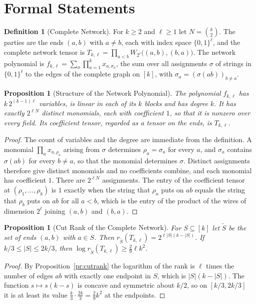 \documentclass[11pt,letterpaper]{report}
\theoremstyle{plain}
\newtheorem{proposition}[theorem]{Proposition}
\theoremstyle{definition}
\newtheorem{definition}[theorem]{Definition}
\theoremstyle{remark}
\begin{document}
\section{Formal Statements}

\begin{definition}[Complete Network]
For $k\ge2$ and $\ell\ge1$ let $N=\binom k2$. The parties are the ends $(a,b)$ with $a\ne b$, each with index space $\{0,1\}^{\ell}$, and the complete network tensor is $T_{k,\ell}=\prod_{a<b}W_{2^{\ell}}\bigl((a,b),(b,a)\bigr)$. The network polynomial is $f_{k,\ell}=\sum_{\sigma}\prod_{a=1}^{k}x_{a,\sigma_a}$, the sum over all assignments $\sigma$ of strings in $\{0,1\}^{\ell}$ to the edges of the complete graph on $[k]$, with $\sigma_a=(\sigma(ab))_{b\ne a}$.
\end{definition}

\begin{proposition}[Structure of the Network Polynomial]\label{pr:netpoly}
The polynomial $f_{k,\ell}$ has $k\,2^{(k-1)\ell}$ variables, is linear in each of its $k$ blocks and has degree $k$. It has exactly $2^{\ell N}$ distinct monomials, each with coefficient $1$, so that it is nonzero over every field. Its coefficient tensor, regarded as a tensor on the ends, is $T_{k,\ell}$.
\end{proposition}
\begin{proof}
The count of variables and the degree are immediate from the definition. A monomial $\prod_ax_{a,\rho_a}$ arising from $\sigma$ determines $\rho_a=\sigma_a$ for every $a$, and $\sigma_a$ contains $\sigma(ab)$ for every $b\ne a$, so that the monomial determines $\sigma$. Distinct assignments therefore give distinct monomials and no coefficients combine, and each monomial has coefficient $1$. There are $2^{\ell N}$ assignments. The entry of the coefficient tensor at $(\rho_1,\ldots,\rho_k)$ is $1$ exactly when the string that $\rho_a$ puts on $ab$ equals the string that $\rho_b$ puts on $ab$ for all $a<b$, which is the entry of the product of the wires of dimension $2^{\ell}$ joining $(a,b)$ and $(b,a)$.
\end{proof}

\begin{proposition}[Cut Rank of the Complete Network]\label{pr:completecut}
For $S\subseteq[k]$ let $\tilde S$ be the set of ends $(a,b)$ with $a\in S$. Then $r_{\tilde S}(T_{k,\ell})=2^{\ell|S|(k-|S|)}$. If $k/3\le|S|\le2k/3$, then $\log r_{\tilde S}(T_{k,\ell})\ge\tfrac29\ell k^{2}$.
\end{proposition}
\begin{proof}
By Proposition~\ref{pr:cutrank} the logarithm of the rank is $\ell$ times the number of edges $ab$ with exactly one endpoint in $S$, which is $|S|(k-|S|)$. The function $s\mapsto s(k-s)$ is concave and symmetric about $k/2$, so on $[k/3,2k/3]$ it is at least its value $\tfrac k3\cdot\tfrac{2k}3=\tfrac29k^2$ at the endpoints.
\end{proof}
\end{document}
